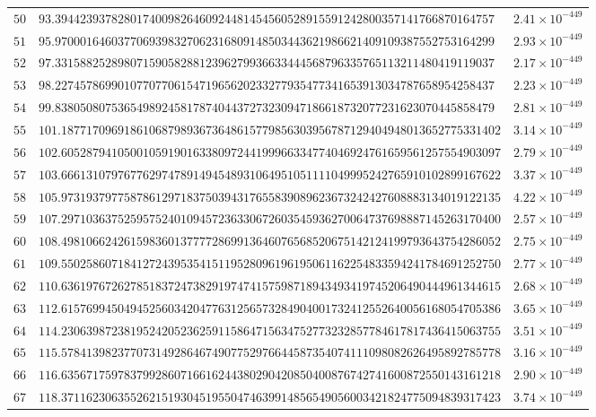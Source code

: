 \documentclass[12pt,reqno]{amsart}
\theoremstyle{remark}
\begin{document}
\begin{longtable}{clc}
$50$ & $93.3944239378280174009826460924481454560528915591242800357141766870164757$ & $2.41\times 10^{-449}$ \\
$51$ & $95.9700016460377069398327062316809148503443621986621409109387552753164299$ & $2.93\times 10^{-449}$ \\
$52$ & $97.3315882528980715905828812396279936633444568796335765113211480419119037$ & $2.17\times 10^{-449}$ \\
$53$ & $98.2274578699010770770615471965620233277935477341653913034787658954258437$ & $2.23\times 10^{-449}$ \\
$54$ & $99.8380508075365498924581787404437273230947186618732077231623070445858479$ & $2.81\times 10^{-449}$ \\
$55$ & $101.1877170969186106879893673648615779856303956787129404948013652775331402$ & $3.14\times 10^{-449}$ \\
$56$ & $102.6052879410500105919016338097244199966334774046924761659561257554903097$ & $2.79\times 10^{-449}$ \\
$57$ & $103.6661310797677629747891494548931064951051111049995242765910102899167622$ & $3.37\times 10^{-449}$ \\
$58$ & $105.9731937977587861297183750394317655839089623673242427608883134019122135$ & $4.22\times 10^{-449}$ \\
$59$ & $107.2971036375259575240109457236330672603545936270064737698887145263170400$ & $2.57\times 10^{-449}$ \\
$60$ & $108.4981066242615983601377772869913646076568520675142124199793643754286052$ & $2.75\times 10^{-449}$ \\
$61$ & $109.5502586071841272439535415119528096196195061162254833594241784691252750$ & $2.77\times 10^{-449}$ \\
$62$ & $110.6361976726278518372473829197474157598718943493419745206490444961344615$ & $2.68\times 10^{-449}$ \\
$63$ & $112.6157699450494525603420477631256573284904001732412552640056168054705386$ & $3.65\times 10^{-449}$ \\
$64$ & $114.2306398723819524205236259115864715634752773232857784617817436415063755$ & $3.51\times 10^{-449}$ \\
$65$ & $115.5784139823770731492864674907752976644587354074111098082626495892785778$ & $3.16\times 10^{-449}$ \\
$66$ & $116.6356717597837992860716616244380290420850400876742741600872550143161218$ & $2.90\times 10^{-449}$ \\
$67$ & $118.3711623063552621519304519550474639914856549056003421824775094839317423$ & $3.74\times 10^{-449}$ \\

\end{longtable}
\end{document}
